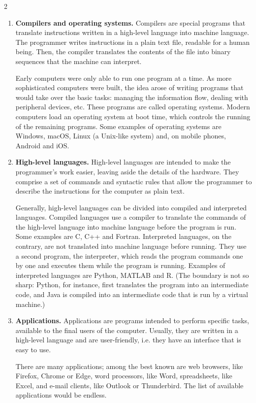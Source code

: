 \begin{paracol}{2}
\begin{enumerate}
\item \textbf{Compilers and operating systems.}  
Compilers are special programs that translate instructions written in a high-level language into machine language. The programmer writes instructions in a plain text file, readable for a human being. Then, the compiler translates the contents of the file into binary sequences that the machine can interpret.

Early computers were only able to run one program at a time. As more sophisticated computers were built, the idea arose of writing programs that would take over the basic tasks: managing the information flow, dealing with peripheral devices, etc. These programs are called operating systems. Modern computers load an operating system at boot time, which controls the running of the remaining programs. Some examples of operating systems are Windows, macOS, Linux (a Unix-like system) and, on mobile phones, Android and iOS.

\item \textbf{High-level languages.} 
High-level languages are intended to make the programmer's work easier, leaving aside the details of the hardware. They comprise a set of commands and syntactic rules that allow the programmer to describe the instructions for the computer as plain text.

Generally, high-level languages can be divided into compiled and interpreted languages. Compiled languages use a compiler to translate the commands of the high-level language into machine language before the program is run. Some examples are C, C++ and Fortran. Interpreted languages, on the contrary, are not translated into machine language before running. They use a second program, the interpreter, which reads the program commands one by one and executes them while the program is running. Examples of interpreted languages are Python, MATLAB and R. (The boundary is not so sharp: Python, for instance, first translates the program into an intermediate code, and Java is compiled into an intermediate code that is run by a virtual machine.)

\item \textbf{Applications.} 
Applications are programs intended to perform specific tasks, available to the final users of the computer. Usually, they are written in a high-level language and are user-friendly, i.e. they have an interface that is easy to use.

There are many applications; among the best known are web browsers, like Firefox, Chrome or Edge, word processors, like Word, spreadsheets, like Excel, and e-mail clients, like Outlook or Thunderbird. The list of available applications would be endless.
\end{enumerate}

\end{paracol}

